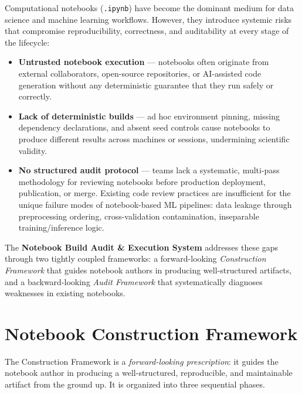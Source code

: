 \documentclass[11pt, a4paper]{article}
\begin{document}
Computational notebooks (\texttt{.ipynb}) have become the dominant medium for
data science and machine learning workflows. However, they introduce systemic
risks that compromise reproducibility, correctness, and auditability at every
stage of the lifecycle:

\begin{itemize}
  \item \textbf{Untrusted notebook execution} — notebooks often originate from
    external collaborators, open-source repositories, or AI-assisted code
    generation without any deterministic guarantee that they run safely or
    correctly.

  \item \textbf{Lack of deterministic builds} — ad hoc environment pinning,
    missing dependency declarations, and absent seed controls cause notebooks
    to produce different results across machines or sessions, undermining
    scientific validity.

  \item \textbf{No structured audit protocol} — teams lack a systematic,
    multi-pass methodology for reviewing notebooks before production
    deployment, publication, or merge. Existing code review practices are
    insufficient for the unique failure modes of notebook-based ML pipelines:
    data leakage through preprocessing ordering, cross-validation
    contamination, inseparable training/inference logic.
\end{itemize}

The \textbf{Notebook Build Audit \& Execution System} addresses these gaps
through two tightly coupled frameworks: a forward-looking \textit{Construction
Framework} that guides notebook authors in producing well-structured
artifacts, and a backward-looking \textit{Audit Framework} that systematically
diagnoses weaknesses in existing notebooks.

\section{Notebook Construction Framework}
\label{sec:construction}

The Construction Framework is a \textit{forward-looking prescription}: it
guides the notebook author in producing a well-structured, reproducible, and
maintainable artifact from the ground up. It is organized into three
sequential phases.
\end{document}
